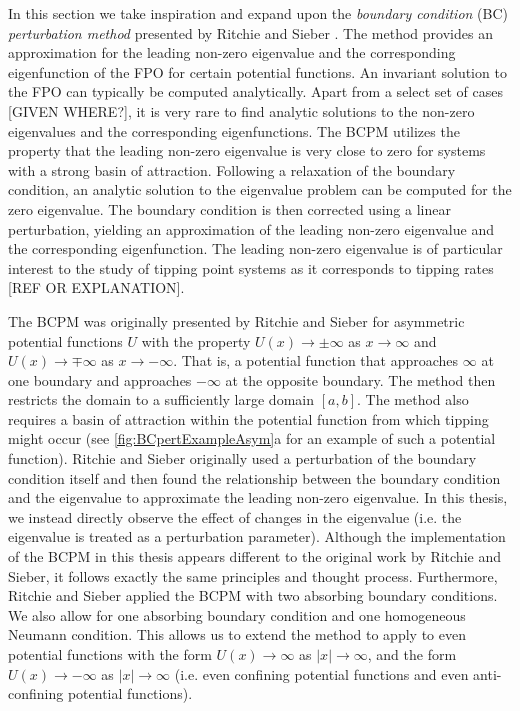 \documentclass[11pt]{amsart}
\begin{document}
In this section we take inspiration and expand upon the \emph{boundary condition} (BC) \emph{perturbation method} presented by Ritchie and Sieber \cite{ritchie_2016_early_warning,ritchie_sieber_2017_noise_rate_tipping}. The method provides an approximation for the leading non-zero eigenvalue and the corresponding eigenfunction of the FPO for certain potential functions. An invariant solution to the FPO can typically be computed analytically. Apart from a select set of cases [GIVEN WHERE?], it is very rare to find analytic solutions to the non-zero eigenvalues and the corresponding eigenfunctions. The BCPM utilizes the property that the leading non-zero eigenvalue is very close to zero for systems with a strong basin of attraction. Following a relaxation of the boundary condition, an analytic solution to the eigenvalue problem can be computed for the zero eigenvalue. The boundary condition is then corrected using a linear perturbation, yielding an approximation of the leading non-zero eigenvalue and the corresponding eigenfunction. The leading non-zero eigenvalue is of particular interest to the study of tipping point systems as it corresponds to tipping rates [REF OR EXPLANATION].

The BCPM was originally presented by Ritchie and Sieber \cite{ritchie_2016_early_warning,ritchie_sieber_2017_noise_rate_tipping} for asymmetric potential functions $U$ with the property $U(x)\to \pm\infty$ as $x \to \infty$ and $U(x)\to \mp\infty$ as $x \to -\infty$. That is, a potential function that approaches $\infty$ at one boundary and approaches $-\infty$ at the opposite boundary. The method then restricts the domain to a sufficiently large domain $[a,b]$. The method also requires a basin of attraction within the potential function from which tipping might occur (see \cref{fig:BCpertExampleAsym}a for an example of such a potential function). Ritchie and Sieber originally used a perturbation of the boundary condition itself and then found the relationship between the boundary condition and the eigenvalue to approximate the leading non-zero eigenvalue. In this thesis, we instead directly observe the effect of changes in the eigenvalue (i.e. the eigenvalue is treated as a perturbation parameter). Although the implementation of the BCPM in this thesis appears different to the original work by Ritchie and Sieber, it follows exactly the same principles and thought process. Furthermore, Ritchie and Sieber applied the BCPM with two absorbing boundary conditions. We also allow for one absorbing boundary condition and one homogeneous Neumann condition. This allows us to extend the method to apply to even potential functions with the form $U(x)\to \infty$ as $|x| \to \infty$, and the form $U(x)\to -\infty$ as $|x| \to \infty$ (i.e. even confining potential functions and even anti-confining potential functions). 
\end{document}
